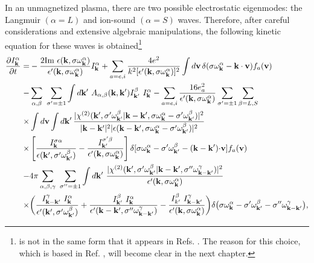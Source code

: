 \documentclass[12pt,a4paper,ruledheader]{report}
\begin{document}
In an unmagnetized plasma, there are two possible electrostatic
eigenmodes: the  Langmuir $(\alpha= L)$ and ion-sound $(\alpha=S)$
waves. Therefore, after careful considerations and extensive
algebraic manipulations, the following kinetic equation for these
waves is obtained\footnote{ is not in the same form
  that it appears in Refs. \cite{Yoon00,Tigik2015}. The reason for this
  choice, which is based in Ref. \cite{YZKS16}, will become clear in
  the next chapter.}\cite{Yoon00,Yoon05a}
\begin{equation}
\begin{split}
  \frac{\partial I^{\alpha}_{\bf k}}{\partial t}
    =&-\frac{2 \mbox{Im}\ \epsilon({\bf k}, \sigma \omega_{\bf k}^{\alpha})}
    {\epsilon '({\bf k},\sigma \omega_{\bf k}^{\alpha})}I^{\alpha}_{\bf k}
    +\sum_{a=e,i}\frac{4e^2}{k^2[\epsilon '({\bf k},\sigma\omega_{\bf k}^\alpha)]^2}
    \int d{\bf v}\, \delta(\sigma\omega_{\bf k}^\alpha-{\bf k \cdot v})
    f_a({\bf v})\\
    -&\sum_{\alpha,\beta}\ \sum_{\sigma '=\pm 1}
    \int d{\bf k '}\ A_{\alpha,\beta}({\bf k,k'})
    I_{\bf k'}^{\beta}\ I_{\bf k}^{\alpha}
    -\sum_{a=e,i}\frac{16 e_a^2}{\epsilon '({\bf k},\sigma\omega_{\bf k}^\alpha)}
    \sum_{\sigma '=\pm 1}\sum_{\beta=L,S}\\
    \times&\int d{\bf v}\int d{\bf k '}\,
    \frac{|\chi^{(2)}({\bf k'},\sigma '\omega_{\bf k'}^{\beta}|{\bf k-k'},
      \sigma \omega_{\bf k}^\alpha-\sigma '\omega_{\bf k'}^{\beta})|^2}
    {|{\bf k-k'}|^2|\epsilon({\bf k-k'},\sigma \omega_{\bf k}^\alpha
      -\sigma '\omega_{\bf k'}^{\beta})|^2}\\
    \times& \left[ \frac{I_{\bf k}^{\sigma \alpha}}
      {\epsilon({\bf k '},\sigma '\omega_{\bf k'}^\beta)}
    -\frac{I_{\bf k'}^{\sigma '\beta}}
    {\epsilon '({\bf k },\sigma \omega_{\bf k}^\alpha)}\right]
   \delta[\sigma \omega_{\bf k}^\alpha-\sigma '\omega_{\bf k'}^\beta
  -({\bf k-k'}){\bf \cdot v}] f_a({\bf v})\\
    -&4\pi \sum_{\alpha,\beta,\gamma}\ \sum_{\sigma ''= \pm 1}\int d{\bf k '}\
    \frac{|\chi^{(2)}({\bf k'},\sigma '\omega_{\bf k'}^\beta|{\bf k-k'},
      \sigma ''\omega_{\bf k-k'}^\gamma)|^2}
       {\epsilon '({\bf k},\sigma \omega_{\bf k}^{\alpha})}\\
       \times& \biggl(\frac{I_{\bf k-k'}^{\gamma}\ I_{\bf k}^{\alpha}}
       {\epsilon '({\bf k'},\sigma ' \omega_{\bf k'}^{\beta})}
       +\frac{I_{\bf k'}^{\beta}\ I_{\bf k}^{\alpha}}
       {\epsilon '({\bf k-k'},\sigma ''\omega_{\bf k-k'}^{\gamma})}
       -\frac{I_{k'}^{\beta}\ I_{\bf k-k'}^{\gamma}}
       {\epsilon '({\bf k},\sigma \omega_{\bf k}^{\alpha})}\biggr)
       \delta\bigl(\sigma \omega_{\bf k}^{\alpha}-\sigma ' \omega_{\bf k'}^{\beta}
       -\sigma '' \omega_{\bf k-k'}^{\gamma}\bigr),
       \label{wave-lin}
\end{split}
\end{equation}
\end{document}
